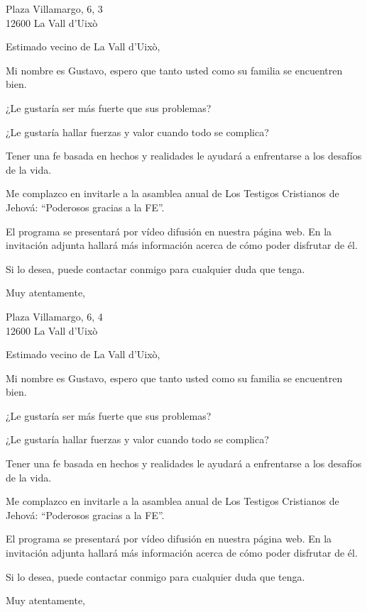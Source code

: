 \documentclass{scrlttr2}
\begin{document}
\begin{letter}{%
Plaza Villamargo, 6, 3\\
12600 La Vall d'Uixò\\
}
\opening{Estimado vecino de La Vall d'Uixò,}

Mi nombre es Gustavo, espero que tanto usted como su familia se encuentren bien.

¿Le gustaría ser más fuerte que sus problemas?

¿Le gustaría hallar fuerzas y valor cuando todo se complica?

Tener una fe basada en hechos y realidades le ayudará a enfrentarse a los desafíos de la vida.

Me complazco en invitarle a la asamblea anual de Los Testigos Cristianos de Jehová: ``Poderosos gracias a la FE''.

El programa se presentará por vídeo difusión en nuestra página web. En la invitación adjunta hallará más información acerca de cómo poder disfrutar de él.

Si lo desea, puede contactar conmigo para cualquier duda que tenga.

\closing{Muy atentamente,}


\end{letter}
\begin{letter}{%
Plaza Villamargo, 6, 4\\
12600 La Vall d'Uixò\\
}
\opening{Estimado vecino de La Vall d'Uixò,}

Mi nombre es Gustavo, espero que tanto usted como su familia se encuentren bien.

¿Le gustaría ser más fuerte que sus problemas?

¿Le gustaría hallar fuerzas y valor cuando todo se complica?

Tener una fe basada en hechos y realidades le ayudará a enfrentarse a los desafíos de la vida.

Me complazco en invitarle a la asamblea anual de Los Testigos Cristianos de Jehová: ``Poderosos gracias a la FE''.

El programa se presentará por vídeo difusión en nuestra página web. En la invitación adjunta hallará más información acerca de cómo poder disfrutar de él.

Si lo desea, puede contactar conmigo para cualquier duda que tenga.

\closing{Muy atentamente,}


\end{letter}
\end{document}
